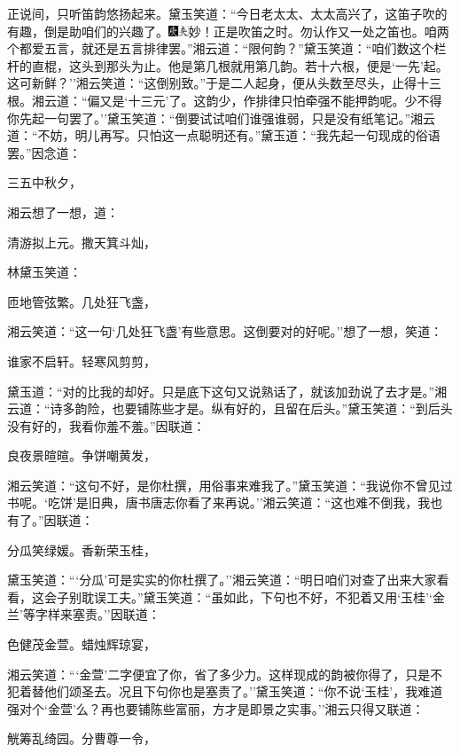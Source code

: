 正说间，只听笛韵悠扬起来。黛玉笑道：``今日老太太、太太高兴了，这笛子吹的有趣，倒是助咱们的兴趣了。{\includegraphics[width=3mm]{../Images/00004}\includegraphics[width=3mm]{../Images/00012}\footnotesize \kaishu 妙！正是吹笛之时。勿认作又一处之笛也。}咱两个都爱五言，就还是五言排律罢。''湘云道：``限何韵？''黛玉笑道：``咱们数这个栏杆的直棍，这头到那头为止。他是第几根就用第几韵。若十六根，便是`一先'起。这可新鲜？''湘云笑道：``这倒别致。''于是二人起身，便从头数至尽头，止得十三根。湘云道：``偏又是`十三元'了。这韵少，作排律只怕牵强不能押韵呢。少不得你先起一句罢了。''黛玉笑道：``倒要试试咱们谁强谁弱，只是没有纸笔记。''湘云道：``不妨，明儿再写。只怕这一点聪明还有。''黛玉道：``我先起一句现成的俗语罢。''因念道：

三五中秋夕，

湘云想了一想，道：

清游拟上元。撒天箕斗灿，

林黛玉笑道：

匝地管弦繁。几处狂飞盏，

湘云笑道：``这一句`几处狂飞盏'有些意思。这倒要对的好呢。''想了一想，笑道：

谁家不启轩。轻寒风剪剪，

黛玉道：``对的比我的却好。只是底下这句又说熟话了，就该加劲说了去才是。''湘云道：``诗多韵险，也要铺陈些才是。纵有好的，且留在后头。''黛玉笑道：``到后头没有好的，我看你羞不羞。''因联道：

良夜景暄暄。争饼嘲黄发，

湘云笑道：``这句不好，是你杜撰，用俗事来难我了。''黛玉笑道：``我说你不曾见过书呢。`吃饼'是旧典，唐书唐志你看了来再说。''湘云笑道：``这也难不倒我，我也有了。''因联道：

分瓜笑绿媛。香新荣玉桂，

黛玉笑道：```分瓜'可是实实的你杜撰了。''湘云笑道：``明日咱们对查了出来大家看看，这会子别耽误工夫。''黛玉笑道：``虽如此，下句也不好，不犯着又用`玉桂'`金兰'等字样来塞责。''因联道：

色健茂金萱。蜡烛辉琼宴，

湘云笑道：```金萱'二字便宜了你，省了多少力。这样现成的韵被你得了，只是不犯着替他们颂圣去。况且下句你也是塞责了。''黛玉笑道：``你不说`玉桂'，我难道强对个`金萱'么？再也要铺陈些富丽，方才是即景之实事。''湘云只得又联道：

觥筹乱绮园。分曹尊一令，

